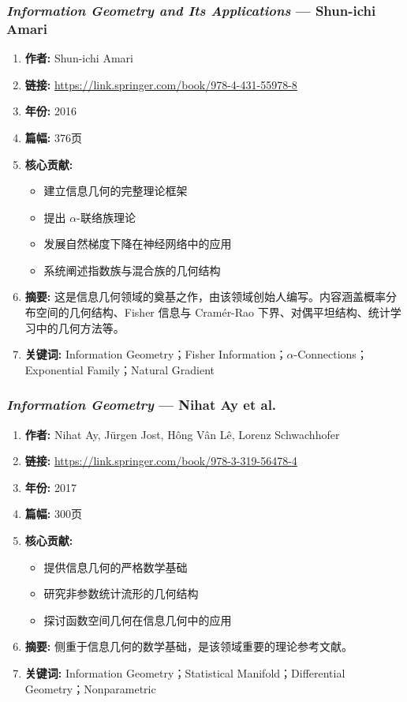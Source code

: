 \subsubsection{\textbf{\textit{Information Geometry and Its Applications}} — Shun-ichi Amari}
\begin{enumerate}
    \item \textbf{作者:} Shun-ichi Amari
    \item \textbf{链接:} \url{https://link.springer.com/book/978-4-431-55978-8}
    \item \textbf{年份:} 2016
    \item \textbf{篇幅:} 376页
    \item \textbf{核心贡献:}
        \begin{itemize}
            \item 建立信息几何的完整理论框架
            \item 提出 $\alpha$-联络族理论
            \item 发展自然梯度下降在神经网络中的应用
            \item 系统阐述指数族与混合族的几何结构
        \end{itemize}
    \item \textbf{摘要:} 这是信息几何领域的奠基之作，由该领域创始人编写。内容涵盖概率分布空间的几何结构、Fisher 信息与 Cramér-Rao 下界、对偶平坦结构、统计学习中的几何方法等。
    \item \textbf{关键词:} Information Geometry；Fisher Information；$\alpha$-Connections；Exponential Family；Natural Gradient
\end{enumerate}

\subsubsection{\textbf{\textit{Information Geometry}} — Nihat Ay et al.}
\begin{enumerate}
    \item \textbf{作者:} Nihat Ay, Jürgen Jost, Hông Vân Lê, Lorenz Schwachhofer
    \item \textbf{链接:} \url{https://link.springer.com/book/978-3-319-56478-4}
    \item \textbf{年份:} 2017
    \item \textbf{篇幅:} 300页
    \item \textbf{核心贡献:}
        \begin{itemize}
            \item 提供信息几何的严格数学基础
            \item 研究非参数统计流形的几何结构
            \item 探讨函数空间几何在信息几何中的应用
        \end{itemize}
    \item \textbf{摘要:} 侧重于信息几何的数学基础，是该领域重要的理论参考文献。
    \item \textbf{关键词:} Information Geometry；Statistical Manifold；Differential Geometry；Nonparametric
\end{enumerate}

